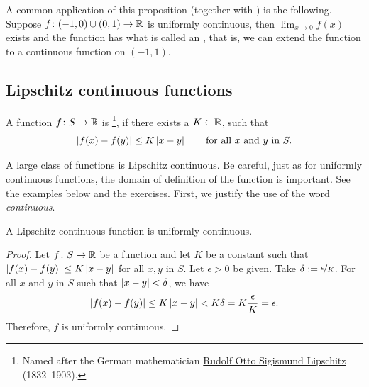 A common application of this proposition (together with
)
is the following.
Suppose $f \colon (-1,0) \cup (0,1) \to {\mathbb{R}}$ is uniformly continuous,
then $\lim_{x\to 0} f(x)$ exists and the function
has what is called an \emph{}, that is,
we can extend the function to a continuous function on $(-1,1)$.


\subsection{Lipschitz continuous functions}

\begin{defn}
A function $f \colon S \to {\mathbb{R}}$
is \emph{}%
\footnote{Named after the German mathematician
\href{https://en.wikipedia.org/wiki/Rudolf_Lipschitz}{Rudolf Otto Sigismund Lipschitz}
(1832--1903).}, if there exists a $K \in {\mathbb{R}}$, such that
\begin{equation*}
\left\lvert {f(x)-f(y)} \right\rvert \leq K \left\lvert {x-y} \right\rvert 
\qquad \text{for all } x \text{ and } y \text{ in } S.
\end{equation*}
\end{defn}

A large class of functions is Lipschitz continuous.  Be careful, just as
for uniformly continuous functions, the
domain of definition of the function is important.  See the examples below
and the exercises.  First, we justify the use of the word \emph{continuous}.

\begin{prop}
A Lipschitz continuous function is uniformly continuous.
\end{prop}

\begin{proof}
Let $f \colon S \to {\mathbb{R}}$ be a function and let $K$ be a constant such that
$\left\lvert {f(x)-f(y)} \right\rvert \leq K \left\lvert {x-y} \right\rvert$
for all $x, y$ in $S$.
Let $\epsilon > 0$ be given.  Take $\delta :=
\nicefrac{\epsilon}{K}$.
For all $x$ and $y$ in $S$ such that
$\left\lvert {x-y} \right\rvert < \delta$,
we have 
\begin{equation*}
\left\lvert {f(x)-f(y)} \right\rvert \leq K \left\lvert {x-y} \right\rvert < K \delta = K \frac{\epsilon}{K} =
\epsilon .
\end{equation*}
Therefore, $f$ is uniformly continuous.
\end{proof}

